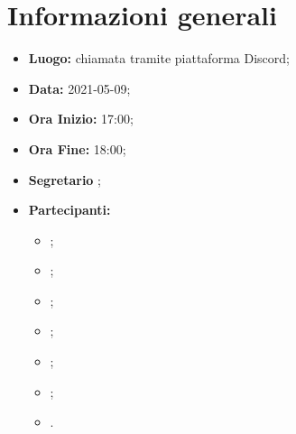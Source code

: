 \section{Informazioni generali}
	\begin{itemize}
		\item \textbf{Luogo:} chiamata tramite piattaforma Discord;
		\item \textbf{Data:} 2021-05-09;
		\item \textbf{Ora Inizio:} 17:00;
		\item \textbf{Ora Fine:} 18:00;
		\item \textbf{Segretario} \NM;
		\item \textbf{Partecipanti:}
		\begin{itemize}
			\item \MB;
			\item \VAS;
			\item \FD;
			\item \NM;
			\item \SB;
			\item \GB;
			\item \MDI.
		\end{itemize}
		
	\end{itemize}
